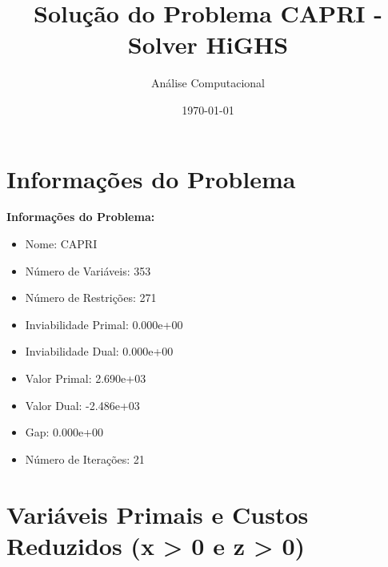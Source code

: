 \documentclass[12pt]{article}
\title{Solução do Problema CAPRI - Solver HiGHS}
\author{Análise Computacional}
\date{\today}
\begin{document}
\maketitle

\section{Informações do Problema}

\textbf{Informações do Problema:}
\begin{itemize}
\item Nome: CAPRI
\item Número de Variáveis: 353
\item Número de Restrições: 271
\item Inviabilidade Primal: 0.000e+00
\item Inviabilidade Dual: 0.000e+00
\item Valor Primal: 2.690e+03
\item Valor Dual: -2.486e+03
\item Gap: 0.000e+00
\item Número de Iterações: 21
\end{itemize}


\section{Variáveis Primais e Custos Reduzidos (x > 0 e z > 0)}
\end{document}
